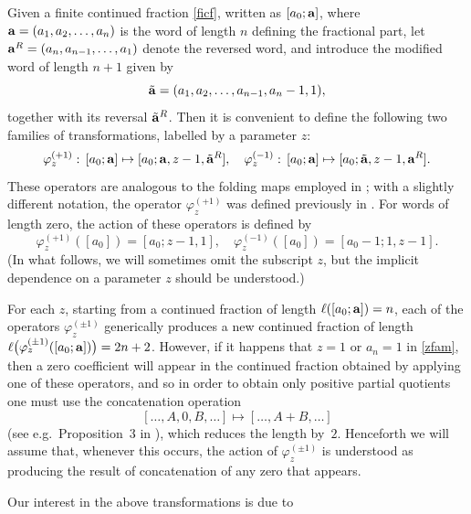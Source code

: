 \documentclass[12pt,a4paper]{amsart}
\theoremstyle{definition}
\numberwithin{equation}{section}
\begin{document}
Given a finite continued fraction \eqref{ficf}, %
written as 
$[a_0; {\bf a}]$, where ${\bf a} = (a_1,a_2,\ldots,a_n)$ is the word of length $n$ 
defining the fractional part, let ${\bf a}^R=(a_n,a_{n-1},\ldots,a_1)$ denote the 
reversed word, and introduce the modified word of length $n+1$ given by 
\[ 
\tilde{{\bf a}} = (a_1,a_2, \ldots, a_{n-1},a_n-1,1), 
\] 
together with its reversal $\tilde{{\bf a}}^R$. 
Then it is 
convenient to define the following two families of transformations, labelled by a parameter $z$: 
\begin{equation}
\label{zfam} 
\varphi_z^{(+1)} : \, [a_0; {\bf a}] \mapsto [a_0; {\bf a}, z-1, \tilde{{\bf a}}^R], 
\quad 
\varphi_z^{(-1)} : \, [a_0; {\bf a}] \mapsto [a_0; \tilde{{\bf a}}, z-1, {\bf a}^R]. 
\end{equation} 
These operators are analogous to the folding maps employed in \cite{folded}; with a slightly different 
notation, the operator $\varphi_z^{(+1)}$ was defined previously in \cite{HoneVar}.  
For words of length zero, the action of these operators is defined by 
\begin{equation}
\label{zerolength} 
\varphi_{z}^{(+1)} ( [a_0]) = [a_0; z-1,1], 
\quad 
\varphi_{z}^{(-1)} ( [a_0] ) = [a_0-1; 1,z-1]. 
\end{equation}
(In what follows, we will sometimes omit the subscript $z$, but the implicit dependence on a parameter 
$z$ should be understood.) 

For each $z$, starting from a continued fraction of length 
$\ell ([a_0; {\bf a}]) =n$, 
each of the operators $\varphi_z^{(\pm 1)}$ generically produces a new continued fraction of length 
$\ell\big(\varphi_z^{(\pm 1)}([a_0;{\bf a}])\big) = 2n+2$. 
However, if it happens that $z=1$ or $a_n=1$ in \eqref{zfam}, then a zero coefficient will appear 
in the continued fraction obtained by applying one of these operators, and so 
in order to obtain only positive partial quotients 
one must use the concatenation operation 
\begin{equation}
\label{concat} 
[\ldots, A, 0, B, \ldots] \mapsto [\ldots, A+B, \ldots]
\end{equation} 
(see e.g.\ Proposition~3 in \cite{folded}), which reduces the length by~$2$. 
Henceforth we will assume that, whenever this occurs, the action of $\varphi_z^{(\pm1)}$ is understood 
as producing the result of concatenation of any zero that appears. 

Our interest in the above transformations is due to 
\end{document}
